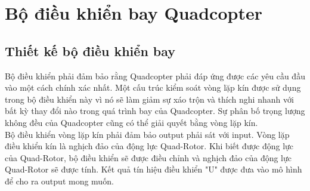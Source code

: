      \section{Bộ điều khiển bay Quadcopter}
     \subsection{Thiết kế bộ điều khiển bay}
            Bộ điều khiển phải đảm bảo rằng Quadcopter phải đáp ứng được các yêu cầu đầu vào một cách chính xác nhất. Một cấu trúc kiểm soát vòng lặp kín được sử dụng trong bộ điều khiển này vì nó sẽ làm giảm sự xáo trộn và thích nghi nhanh với bất kỳ thay đổi nào trong quá trình bay của Quadcopter. Sự phân bố trọng lượng không đều của Quadcopter cũng có thể giải quyết bằng vòng lặp kín.
            \\
            Bộ điều khiển vòng lặp kín phải đảm bảo output phải sát với input. Vòng lặp điều khiển kín là nghịch đảo của động lực Quad-Rotor. Khi biết được động lực của Quad-Rotor, bộ điều khiển sẽ được điều chỉnh và nghịch đảo của động lực Quad-Rotor sẽ được tính. Kết quả tín hiệu điều khiển "U" được đưa vào mô hình để cho ra output mong muốn. 
